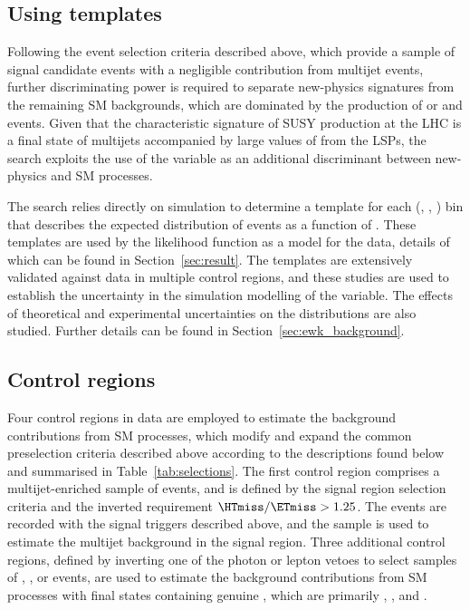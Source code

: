 \subsection{Using \texorpdfstring{\HTmiss}{HTmiss} templates}
\label{sec:mht_templates} 

Following the event selection criteria described above, which provide
a sample of signal candidate events with a negligible contribution
from multijet events, further discriminating power is required to
separate new-physics signatures from the remaining SM backgrounds,
which are dominated by the production of \ttbar or \wlj and \znunuj
events. Given that the characteristic signature of SUSY production at
the LHC is a final state of multijets accompanied by large values of
\ptvecmiss from the LSPs, the search exploits the use of the \HTmiss
variable as an additional discriminant between new-physics and SM
processes.

The search relies directly on simulation to determine a template for
each (\njet, \nb, \scalht) bin that describes the expected
distribution of events as a function of \HTmiss. These templates are
used by the likelihood function as a model for the data, details of
which can be found in Section~\ref{sec:result}. The templates are
extensively validated against data in multiple control regions, and
these studies are used to establish the uncertainty in the simulation
modelling of the \HTmiss variable. The effects of theoretical and
experimental uncertainties on the \HTmiss distributions are also
studied. Further details can be found in
Section~\ref{sec:ewk_background}.


\subsection{Control regions}
\label{sec:control_regions}

Four control regions in data are employed to estimate the background
contributions from SM processes, which modify and expand the common
preselection criteria described above according to the descriptions
found below and summarised in Table~\ref{tab:selections}. The first
control region comprises a multijet-enriched sample of events, and is
defined by the signal region selection criteria and the inverted
requirement $\HTmiss / \ETmiss > 1.25$. The events are recorded with
the signal triggers described above, and the sample is used to
estimate the multijet background in the signal region. Three
additional control regions, defined by inverting one of the photon or
lepton vetoes to select samples of \gj, \mj, or \mmj events, are used
to estimate the background contributions from SM processes with final
states containing genuine \ptvecmiss, which are primarily \ttbar,
\wlj, and \znunuj.

